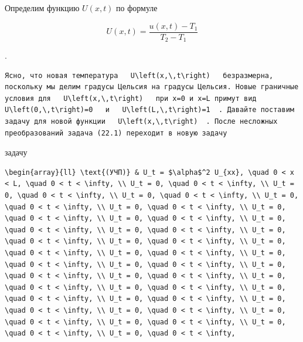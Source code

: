 \documentclass[
  ukrainian,
]{article}
\begin{document}
Определим функцию \(U(x, t)\) по формуле

\[
U(x, t) = \frac{u(x, t) - T_1}{T_2 - T_1}
\]

.

\begin{verbatim}
Ясно, что новая температура   U\left(x,\,t\right)   безразмерна, поскольку мы делим градусы Цельсия на градусы Цельсия. Новые граничные условия для   U\left(x,\,t\right)   при x=0 и x=L примут вид   U\left(0,\,t\right)=0   и   U\left(L,\,t\right)=1  . Давайте поставим задачу для новой функции   U\left(x,\,t\right)  . После несложных преобразований задача (22.1) переходит в новую задачу
\end{verbatim}

задачу

\begin{verbatim}
\begin{array}{ll} \text{(УЧП)} & U_t = $\alpha$^2 U_{xx}, \quad 0 < x < L, \quad 0 < t < \infty, \\ U_t = 0, \quad 0 < t < \infty, \\ U_t = 0, \quad 0 < t < \infty, \\ U_t = 0, \quad 0 < t < \infty, \\ U_t = 0, \quad 0 < t < \infty, \\ U_t = 0, \quad 0 < t < \infty, \\ U_t = 0, \quad 0 < t < \infty, \\ U_t = 0, \quad 0 < t < \infty, \\ U_t = 0, \quad 0 < t < \infty, \\ U_t = 0, \quad 0 < t < \infty, \\ U_t = 0, \quad 0 < t < \infty, \\ U_t = 0, \quad 0 < t < \infty, \\ U_t = 0, \quad 0 < t < \infty, \\ U_t = 0, \quad 0 < t < \infty, \\ U_t = 0, \quad 0 < t < \infty, \\ U_t = 0, \quad 0 < t < \infty, \\ U_t = 0, \quad 0 < t < \infty, \\ U_t = 0, \quad 0 < t < \infty, \\ U_t = 0, \quad 0 < t < \infty, \\ U_t = 0, \quad 0 < t < \infty, \\ U_t = 0, \quad 0 < t < \infty, \\ U_t = 0, \quad 0 < t < \infty, \\ U_t = 0, \quad 0 < t < \infty, \\ U_t = 0, \quad 0 < t < \infty, \\ U_t = 0, \quad 0 < t < \infty, \\ U_t = 0, \quad 0 < t < \infty, \\ U_t = 0, \quad 0 < t < \infty, \\ U_t = 0, \quad 0 < t < \infty, 
\end{verbatim}
\end{document}

